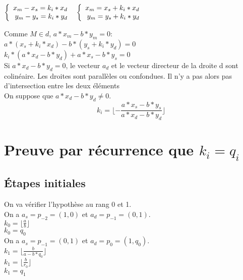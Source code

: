 \documentclass{article}
\begin{document}
$
\left \{
\begin{array}{r c l}
  x_{m} - x_{s} = k_{i}*x_{d}\\
  y_{m} - y_{s} = k_{i}*y_{d}\\
\end{array}
\right .
\\$\newline
$
\left \{
\begin{array}{r c l}
  x_{m} = x_{s} + k_{i}*x_{d}\\
  y_{m} = y_{s} + k_{i}*y_{d}\\
\end{array}
\right .
$\newline

Comme $M \in d$,\newline
$a*x_{m} - b*y_{m} = 0 $: \\
$a*(x_s + k_i*x_d) - b*(y_s + k_i*y_d) = 0$\\
$k_i*(a*x_d - b*y_d) + a*x_s - b*y_s = 0$\\

Si $a*x_d - b*y_d = 0$, le vecteur $a_d$ et le vecteur directeur de la droite d sont colinéaire. Les droites sont parallèles ou confondues. Il n'y a pas alors pas d'intersection entre les deux éléments\\

On suppose que $a*x_d - b*y_d \ne 0$.\\

$$k_i = \lfloor - \frac{a*x_s - b*y_s}{a*x_d - b*y_d} \rfloor$$

\section{Preuve par récurrence que $k_{i} = q_{i}$}
\subsection{Étapes initiales}

On va vérifier l'hypothèse au rang 0 et 1. \\
On a $a_s = p_{-2} = (1,0)$ et $a_d = p_{-1} = (0,1)$.\\

$k_{0} = \lfloor \frac{a}{b} \rfloor$\\
$k_{0} = q_{0}$\\

On a $a_s = p_{-1} = (0,1)$ et $a_d = p_{0} = (1,q_0)$.\\

$k_{1} = \lfloor \frac{b}{a - b * q_0} \rfloor$\\
$k_{1} = \lfloor \frac{b}{r_0} \rfloor$\\
$k_{1} = q_{1}$\\
\end{document}

